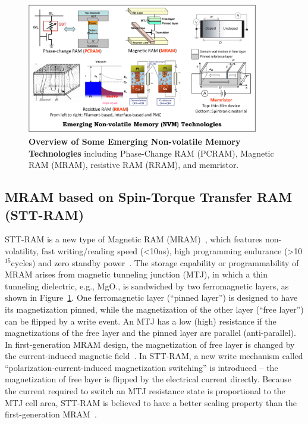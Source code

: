 \begin{figure}
\centering
\includegraphics[width=0.9\textwidth]{./figure/1_technology_half.pdf} 
\vspace{-10pt}
\caption{\textbf{Overview of Some Emerging Non-volatile Memory Technologies} including Phase-Change RAM (PCRAM), Magnetic RAM (MRAM), resistive RAM (RRAM), and memristor. }
\label{technology} 
\vspace{-10pt}
\end{figure}

\subsection{MRAM based on Spin-Torque Transfer RAM (STT-RAM)}
STT-RAM is a new type of Magnetic RAM (MRAM)~\cite{ITRS07,Hosomi05,MRAM:TTO+06,MRAM:ZBM+06,mram:ibm:maffitt}, which features non-volatility, fast writing/reading speed (\textless 10ns), high programming endurance (\textgreater 10$^{15}$cycles) and zero standby power~\cite{ITRS07}. The storage capability or programmability of MRAM arises from magnetic tunneling junction (MTJ), in which a thin tunneling dielectric, e.g., MgO., is sandwiched by two ferromagnetic layers, as shown in Figure~\ref{technology}. One ferromagnetic layer (``pinned layer'') is designed to have its magnetization pinned, while the magnetization of the other layer (``free layer'') can be flipped by a write event. An MTJ has a low (high) resistance if the magnetizations of the free layer and the pinned layer are parallel (anti-parallel). In first-generation MRAM design, the magnetization of free layer is changed by the current-induced magnetic field~\cite{Motoyoshi04,Ha04}. In STT-RAM, a new write mechanism called ``polarization-current-induced magnetization switching'' is introduced -- the magnetization of free layer is flipped by the electrical current directly. Because the current required to switch an MTJ resistance state is proportional to the MTJ cell area, STT-RAM is believed to have a better scaling property than the first-generation MRAM~\cite{Hosomi05,Kawahara07,MRAM:TTO+06,Diao07,Salahuddin07,Beach08,Kishi08}.


